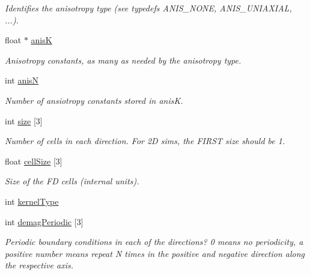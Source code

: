 \begin{DoxyCompactItemize}
\begin{DoxyCompactList}\small\item\em Identifies the anisotropy type (see typedefs ANIS\_\-NONE, ANIS\_\-UNIAXIAL, ...). \item\end{DoxyCompactList}\item 
float $\ast$ \hyperlink{structparam_a048929d707ab3a3e0422c4480a6363c8}{anisK}
\begin{DoxyCompactList}\small\item\em Anisotropy constants, as many as needed by the anisotropy type. \item\end{DoxyCompactList}\item 
int \hyperlink{structparam_a29f829cb0bc4c83180acfa598da79955}{anisN}
\begin{DoxyCompactList}\small\item\em Number of ansiotropy constants stored in anisK. \item\end{DoxyCompactList}\item 
int \hyperlink{structparam_ac605a2849b68010928482f29b7b2e2f4}{size} \mbox{[}3\mbox{]}
\begin{DoxyCompactList}\small\item\em Number of cells in each direction. For 2D sims, the FIRST size should be 1. \item\end{DoxyCompactList}\item 
float \hyperlink{structparam_a00c9d4254065173938a44d390b262c09}{cellSize} \mbox{[}3\mbox{]}
\begin{DoxyCompactList}\small\item\em Size of the FD cells (internal units). \item\end{DoxyCompactList}\item 
int \hyperlink{structparam_affac74c265217e342f33965a98117c32}{kernelType}
\item 
int \hyperlink{structparam_a86db590d75a57deb605c162263f8f696}{demagPeriodic} \mbox{[}3\mbox{]}
\begin{DoxyCompactList}\small\item\em Periodic boundary conditions in each of the directions? 0 means no periodicity, a positive number means repeat N times in the positive and negative direction along the respective axis. \item\end{DoxyCompactList}\item 

\end{DoxyCompactItemize}
